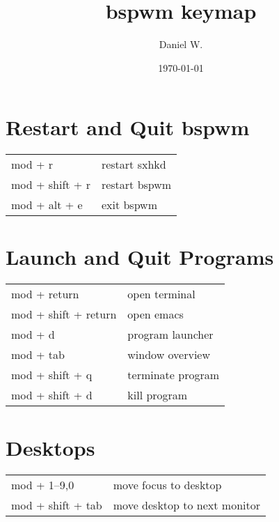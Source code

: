 \documentclass[
    10pt,
    a4paper,
    notitlepage,
]{scrartcl}
\title{bspwm keymap}
\author{Daniel W.}
\date{\today}
\begin{document}
\maketitle

\section{Restart and Quit bspwm}
\begin{tabular}{p{4cm}l}
    mod + r             & restart sxhkd \\
    mod + shift + r     & restart bspwm \\
    mod + alt + e       & exit bspwm
\end{tabular}

\section{Launch and Quit Programs}
\begin{tabular}{p{4cm}l}
    mod + return            & open terminal       \\
    mod + shift + return    & open emacs          \\
    mod + d                 & program launcher    \\
    mod + tab               & window overview     \\
    mod + shift + q         & terminate program   \\
    mod + shift + d         & kill program
\end{tabular}

\section{Desktops}
\begin{tabular}{p{4cm}l}
    mod + 1--9,0          & move focus to desktop         \\
    mod + shift + tab     & move desktop to next monitor
\end{tabular}
\end{document}
